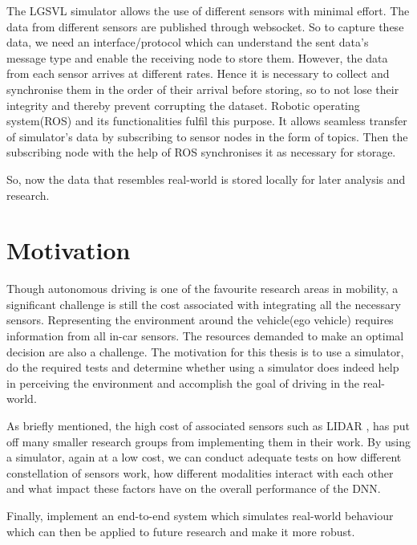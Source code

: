The LGSVL simulator allows the use of different sensors with minimal effort. The data
from different sensors are published through websocket. So to capture these data, we
need an interface/protocol which can understand the sent data's message type and enable the
receiving node to store them. However, the data from each sensor arrives at
different rates. Hence it is necessary to collect and synchronise them in the order of their arrival
before storing, so to not lose their integrity and thereby prevent corrupting the dataset.
Robotic operating system(ROS) \cite{ROS2} and its functionalities fulfil
this purpose. It allows seamless transfer of simulator's data by subscribing to sensor
nodes in the form of topics. Then the subscribing node with the help of ROS synchronises it as necessary for storage.

So, now the data that resembles real-world is stored locally for later analysis and
research.


\section{Motivation}

Though autonomous driving is one of the favourite research areas in mobility,
a significant challenge is still the cost associated with integrating all the necessary sensors.
Representing the environment around the vehicle(ego vehicle) requires information from all in-car sensors.
The resources demanded to make an optimal decision are also a challenge. The motivation for this thesis is
to use a simulator, do the required tests and
determine whether using a simulator does indeed help in perceiving the environment
and accomplish the goal of driving in the real-world.

As briefly mentioned, the high cost of associated sensors such as LIDAR
\cite{VergeReportLidar},  has put off many smaller research groups from implementing them
in their work. By using a simulator, again at a low cost, we can conduct adequate tests
on how different constellation of sensors work, how different modalities interact with each other and
what impact these factors have on the overall performance of the DNN.

Finally, implement an end-to-end system which simulates real-world behaviour which can
then be applied to future research and make it more robust.

